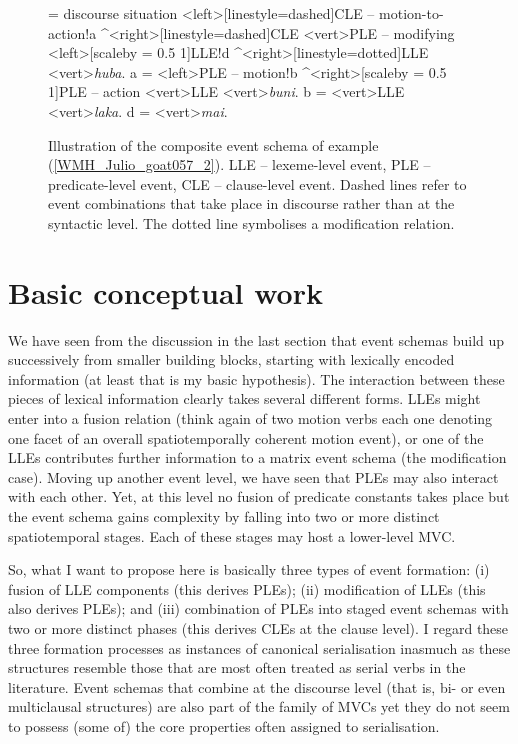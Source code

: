 \begin{figure}
\jtree[xunit=7em,yunit=2em]
\! = {discourse situation}
<left>[linestyle=dashed]{CLE -- motion-to-action}!a ^<right>[linestyle=dashed]{CLE}
<vert>{PLE -- modifying}
<left>[scaleby = 0.5 1]{LLE}!d ^<right>[linestyle=dotted]{LLE}
<vert>{\textit{huba}}.
\!a = <left>{PLE -- motion}!b ^<right>[scaleby = 0.5 1]{PLE -- action}
<vert>{LLE}
<vert>{\textit{buni}}.
\!b = <vert>{LLE}
<vert>{\textit{laka}}.
\!d = <vert>{\textit{mai}}.
\endjtree
\caption[Event schema illustration of example (\ref{WMH_Julio_goat057_2})]{Illustration of the composite event schema of example (\ref{WMH_Julio_goat057_2}). LLE -- lexeme-level event, PLE -- predicate-level event, CLE -- clause-level event. Dashed lines refer to event combinations that take place in discourse rather than at the syntactic level. The dotted line symbolises a modification relation.}
\label{figure:eventschema}
\end{figure}

\section{Basic conceptual work} \label{sec:conceptualwork}

We have seen from the discussion in the last section that event schemas build up successively from smaller building blocks, starting with lexically encoded information (at least that is my basic hypothesis). The interaction between these pieces of lexical information clearly takes several different forms. LLEs might enter into a fusion relation (think again of two motion verbs each one denoting one facet of an overall spatiotemporally coherent motion event), or one of the LLEs contributes further information to a matrix event schema (the modification case). Moving up another event level, we have seen that PLEs may also interact with each other. Yet, at this level no fusion of predicate constants takes place but the event schema gains complexity by falling into two or more distinct spatiotemporal stages. Each of these stages may host a lower-level MVC.

So, what I want to propose here is basically three types of event formation: (i) fusion of LLE components (this derives PLEs); (ii) modification of LLEs (this also derives PLEs); and (iii) combination of PLEs into staged event schemas with two or more distinct phases (this derives CLEs at the clause level). I regard these three formation processes as instances of canonical serialisation inasmuch as these structures resemble those that are most often treated as serial verbs in the literature. Event schemas that combine at the discourse level (that is, bi- or even multiclausal structures) are also part of the family of MVCs yet they do not seem to possess (some of) the core properties often assigned to serialisation. 

